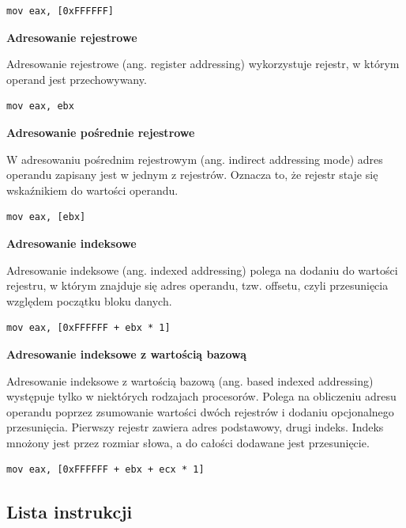 \documentclass[a4paper,12pt]{article}
\begin{document}
\begin{lstlisting}[numbers=none, xleftmargin=0]
mov eax, [0xFFFFFF]
\end{lstlisting}

\textbf{Adresowanie rejestrowe}

Adresowanie rejestrowe (ang. register addressing) wykorzystuje rejestr, w którym operand jest przechowywany.

\begin{lstlisting}[numbers=none, xleftmargin=0]
mov eax, ebx
\end{lstlisting}

\textbf{Adresowanie pośrednie rejestrowe}

W adresowaniu pośrednim rejestrowym (ang. indirect addressing mode) adres operandu zapisany jest w jednym z rejestrów. Oznacza to, że rejestr staje się wskaźnikiem do wartości operandu.

\begin{lstlisting}[numbers=none, xleftmargin=0]
mov eax, [ebx]
\end{lstlisting}

\textbf{Adresowanie indeksowe}

Adresowanie indeksowe (ang. indexed addressing) polega na dodaniu do wartości rejestru, w którym znajduje się adres operandu, tzw. offsetu, czyli przesunięcia względem początku bloku danych.

\begin{lstlisting}[numbers=none, xleftmargin=0]
mov eax, [0xFFFFFF + ebx * 1]
\end{lstlisting}

\textbf{Adresowanie indeksowe z wartością bazową}

Adresowanie indeksowe z wartością bazową (ang. based indexed addressing) występuje tylko w niektórych rodzajach procesorów. Polega na obliczeniu adresu operandu poprzez zsumowanie wartości dwóch rejestrów i dodaniu opcjonalnego przesunięcia. Pierwszy rejestr zawiera adres podstawowy, drugi indeks. Indeks mnożony jest przez rozmiar słowa, a do całości dodawane jest przesunięcie.

\begin{lstlisting}[numbers=none, xleftmargin=0]
mov eax, [0xFFFFFF + ebx + ecx * 1]
\end{lstlisting}

\subsection{Lista instrukcji}
\end{document}
